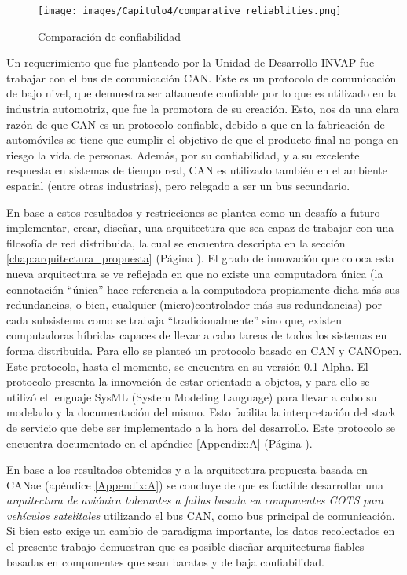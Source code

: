 \begin{figure}[H]
 \centering
 \texttt{[image: images/Capitulo4/comparative\_reliablities.png]}
  \caption{Comparación de confiabilidad}
\label{fig:comparative_reliablitiesConclusion}
\end{figure}

Un requerimiento que fue planteado por la Unidad de Desarrollo INVAP fue trabajar
con el bus de comunicación CAN. Este es un protocolo de comunicación de bajo nivel,
que demuestra ser altamente confiable por lo que es utilizado en la industria automotriz,
que fue la promotora de su creación. Esto, nos da una clara razón de que CAN es un
protocolo confiable, debido a que en la fabricación de automóviles se tiene que cumplir
el objetivo de que el producto final no ponga en riesgo la vida de personas.
Además, por su confiabilidad, y a su excelente respuesta en sistemas de tiempo real,
CAN es utilizado también en el ambiente espacial (entre otras industrias), pero
relegado a ser un bus secundario.

En base a estos resultados y restricciones se plantea como un desafío a futuro implementar,
crear, diseñar, una arquitectura que sea capaz de trabajar con una filosofía
de red distribuida, la cual se encuentra descripta en la sección \ref{chap:arquitectura_propuesta}
(Página \pageref{chap:arquitectura_propuesta}). El grado de innovación que coloca
esta nueva arquitectura se ve reflejada en que no existe una computadora única (la
connotación ``única'' hace referencia a la computadora propiamente dicha más sus
redundancias, o bien, cualquier (micro)controlador más sus redundancias) por cada
subsistema como se trabaja ``tradicionalmente'' sino que, existen computadoras
híbridas capaces de llevar a cabo tareas de todos los sistemas en forma distribuida. 
Para ello se planteó un protocolo basado en CAN y CANOpen. Este protocolo, hasta el
momento, se encuentra en su versión 0.1 Alpha. El protocolo
presenta la innovación de estar orientado a objetos, y para ello se utilizó el
lenguaje SysML (System Modeling Language) para llevar a cabo su modelado y
la documentación del mismo. Esto facilita la interpretación del
stack de servicio que debe ser implementado a la hora del desarrollo. Este protocolo
se encuentra documentado en el apéndice \ref{Appendix:A} (Página \pageref{Appendix:A}).

En base a los resultados obtenidos y a la arquitectura propuesta basada en CANae
(apéndice \ref{Appendix:A}) se concluye de que es factible  desarrollar una
\textit{arquitectura de aviónica tolerantes a fallas basada en componentes COTS para
  vehículos satelitales} utilizando el bus CAN, como bus principal de comunicación.
Si bien esto exige un cambio de paradigma importante, los datos recolectados en el
presente trabajo demuestran que es posible diseñar arquitecturas
fiables basadas en componentes que sean baratos y de baja confiabilidad. 

